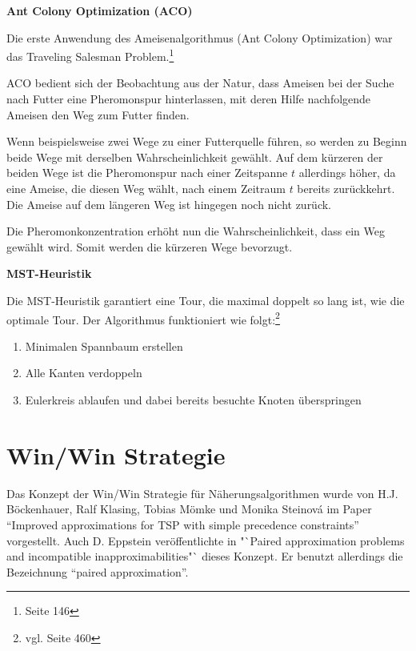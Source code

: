 \documentclass[11pt,a4paper]{article}
\begin{document}
\begin{flushleft}
\textbf{Ant Colony Optimization (ACO)}

Die erste Anwendung des Ameisenalgorithmus (Ant Colony Optimization) war das Traveling Salesman Problem.\footnote{\cite{dorigo99} Seite 146}

ACO bedient sich der Beobachtung aus der Natur, dass Ameisen bei der Suche nach Futter eine Pheromonspur hinterlassen, mit deren Hilfe nachfolgende Ameisen den Weg zum Futter finden.

Wenn beispielsweise zwei Wege zu einer Futterquelle führen, so werden zu Beginn beide Wege mit derselben Wahrscheinlichkeit gewählt. Auf dem kürzeren der beiden Wege ist die Pheromonspur nach einer Zeitspanne $t$ allerdings höher, da eine Ameise, die diesen Weg wählt, nach einem Zeitraum $t$ bereits zurückkehrt. Die Ameise auf dem längeren Weg ist hingegen noch nicht zurück.

Die Pheromonkonzentration erhöht nun die Wahrscheinlichkeit, dass ein Weg gewählt wird. Somit werden die kürzeren Wege bevorzugt. \cite{dorigo99}

\end{flushleft}

\medskip

\begin{flushleft}
\textbf{MST-Heuristik}

Die MST-Heuristik garantiert eine Tour, die maximal doppelt so lang ist, wie die optimale Tour. Der Algorithmus funktioniert wie folgt:\footnote{vgl. \cite{teschl06} Seite 460}

\begin{enumerate}
    \item Minimalen Spannbaum erstellen
    \item Alle Kanten verdoppeln
    \item Eulerkreis ablaufen und dabei bereits besuchte Knoten überspringen
\end{enumerate}

\end{flushleft}
\newpage
\section{Win/Win Strategie}
Das Konzept der Win/Win Strategie für Näherungsalgorithmen wurde von H.J. Böckenhauer, Ralf Klasing, Tobias Mömke und Monika Steinová im Paper "`Improved approximations for TSP with simple precedence constraints"'\cite{boeckenhauer10} vorgestellt.  Auch D. Eppstein veröffentlichte in "`Paired approximation problems and incompatible inapproximabilities"`\cite{eppstein10} dieses Konzept. Er benutzt allerdings die Bezeichnung "`paired approximation"'.
\end{document}
